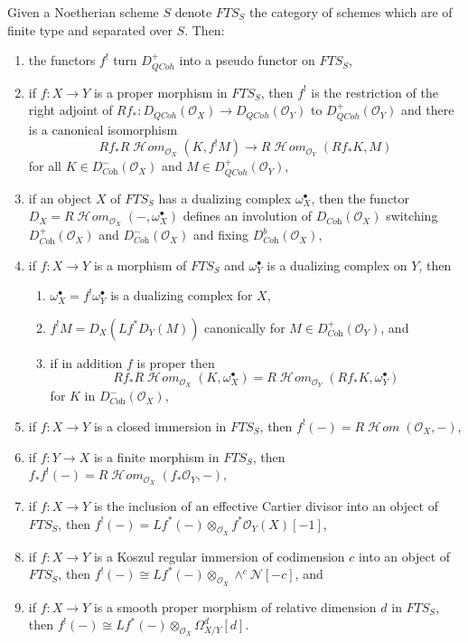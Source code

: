 \documentclass{stacks-project}
\theoremstyle{plain}
\theoremstyle{definition}
\theoremstyle{remark}
\numberwithin{equation}{subsection}
\def\SheafHom{\mathop{\mathcal{H}\!\mathit{om}}\nolimits}
\def\QCoh{\mathit{QCoh}}
\begin{document}
\medskip\noindent
Given a Noetherian scheme $S$ denote $\textit{FTS}_S$ the category
of schemes which are of finite type and separated over $S$. Then:
\begin{enumerate}
\item the functors $f^!$ turn $D_\QCoh^+$ into a pseudo functor
on $\textit{FTS}_S$,
\item if $f : X \to Y$ is a proper morphism in $\textit{FTS}_S$,
then $f^!$ is the restriction of the right adjoint of
$Rf_* : D_\QCoh(\mathcal{O}_X) \to D_\QCoh(\mathcal{O}_Y)$
to $D_\QCoh^+(\mathcal{O}_Y)$ and there is a canonical isomorphism
$$
Rf_*R\SheafHom_{\mathcal{O}_X}(K, f^!M)
\to
R\SheafHom_{\mathcal{O}_Y}(Rf_*K, M)
$$
for all $K \in D_{\textit{Coh}}^-(\mathcal{O}_X)$ and
$M \in D_\QCoh^+(\mathcal{O}_Y)$,
\item if an object $X$ of $\textit{FTS}_S$ has a dualizing complex
$\omega_X^\bullet$, then the functor
$D_X = R\SheafHom_{\mathcal{O}_X}(-, \omega_X^\bullet)$
defines an involution of $D_{\textit{Coh}}(\mathcal{O}_X)$
switching $D_{\textit{Coh}}^+(\mathcal{O}_X)$ and
$D_{\textit{Coh}}^-(\mathcal{O}_X)$ and fixing
$D_{\textit{Coh}}^b(\mathcal{O}_X)$,
\item if $f : X \to Y$ is a morphism of $\textit{FTS}_S$
and $\omega_Y^\bullet$ is a dualizing complex on $Y$, then
\begin{enumerate}
\item $\omega_X^\bullet = f^!\omega_Y^\bullet$ is a dualizing complex for $X$,
\item $f^!M = D_X(Lf^*D_Y(M))$ canonically for
$M \in D_{\textit{Coh}}^+(\mathcal{O}_Y)$, and
\item if in addition $f$ is proper then
$$
Rf_*R\SheafHom_{\mathcal{O}_X}(K, \omega_X^\bullet) =
R\SheafHom_{\mathcal{O}_Y}(Rf_*K, \omega_Y^\bullet)
$$
for $K$ in $D^-_{\textit{Coh}}(\mathcal{O}_X)$,
\end{enumerate}
\item if $f : X \to Y$ is a closed immersion in $\textit{FTS}_S$,
then $f^!(-) = R\SheafHom(\mathcal{O}_X, -)$,
\item if $f : Y \to X$ is a finite morphism in $\textit{FTS}_S$,
then $f_*f^!(-) = R\SheafHom_{\mathcal{O}_X}(f_*\mathcal{O}_Y, -)$,
\item if $f : X \to Y$ is the inclusion of an effective Cartier divisor
into an object of $\textit{FTS}_S$, then
$f^!(-) = Lf^*(-) \otimes_{\mathcal{O}_X} f^*\mathcal{O}_Y(X)[-1]$,
\item if $f : X \to Y$ is a Koszul regular immersion of codimension $c$
into an object of $\textit{FTS}_S$, then
$f^!(-) \cong Lf^*(-) \otimes_{\mathcal{O}_X} \wedge^c\mathcal{N}[-c]$, and
\item if $f : X \to Y$ is a smooth proper morphism of relative dimension $d$
in $\textit{FTS}_S$, then
$f^!(-) \cong Lf^*(-)  \otimes_{\mathcal{O}_X} \Omega^d_{X/Y}[d]$.
\end{enumerate}
\end{document}
